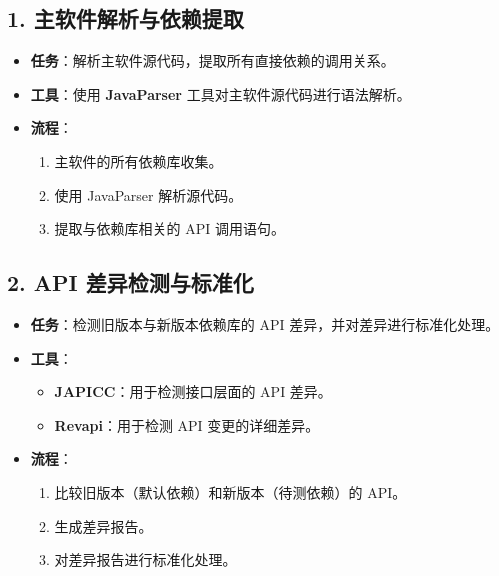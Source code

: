 \documentclass[14pt,a4paper,UTF8,twoside]{article}
\begin{document}
\begin{multicols}{3} %

    \subsection*{1. 主软件解析与依赖提取}
    \begin{itemize}
        \item \textbf{任务}：解析主软件源代码，提取所有直接依赖的调用关系。
        \item \textbf{工具}：使用 \textbf{JavaParser} 工具对主软件源代码进行语法解析。
        \item \textbf{流程}：
        \begin{enumerate}
            \item 主软件的所有依赖库收集。
            \item 使用 JavaParser 解析源代码。
            \item 提取与依赖库相关的 API 调用语句。
        \end{enumerate}
    \end{itemize}

    \columnbreak %

    \subsection*{2. API 差异检测与标准化}
    \begin{itemize}
        \item \textbf{任务}：检测旧版本与新版本依赖库的 API 差异，并对差异进行标准化处理。
        \item \textbf{工具}：
        \begin{itemize}
            \item \textbf{JAPICC}：用于检测接口层面的 API 差异。
            \item \textbf{Revapi}：用于检测 API 变更的详细差异。
        \end{itemize}
        \item \textbf{流程}：
        \begin{enumerate}
            \item 比较旧版本（默认依赖）和新版本（待测依赖）的 API。
            \item 生成差异报告。
            \item 对差异报告进行标准化处理。
        \end{enumerate}
    \end{itemize}


\end{multicols}
\end{document}
